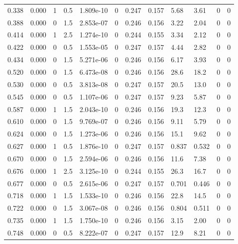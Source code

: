\documentclass[preview]{standalone}
\begin{document}
{{\begin{tabular}{L{1.2cm}C{1.2cm} C{0.3cm}C{0.5cm} C{1.4cm}C{1.4cm} C{1.4cm}C{1.4cm} C{1.6cm}C{1.6cm} C{1.6cm}C{1.6cm}}
  0.338  &  0.000  & 1     & 0.5 &  1.809e-10  & 0  &  0.247&   0.157& 5.68 & 3.61   &  0 & 0  \\ 
  0.388  &  0.000  & 0     & 1.5 &  2.853e-07  & 0  &  0.246&   0.156& 3.22 & 2.04   &  0 & 0  \\ 
  0.414  &  0.000  & 1     & 2.5 &  1.274e-10  & 0  &  0.244&   0.155& 3.34 & 2.12   &  0 & 0  \\ 
  0.422  &  0.000  & 0     & 0.5 &  1.553e-05  & 0  &  0.247&   0.157& 4.44 & 2.82   &  0 & 0  \\ 
  0.434  &  0.000  & 0     & 1.5 &  5.271e-06  & 0  &  0.246&   0.156& 6.17 & 3.93   &  0 & 0  \\ 
  0.520  &  0.000  & 0     & 1.5 &  6.473e-08  & 0  &  0.246&   0.156& 28.6 & 18.2   &  0 & 0  \\ 
  0.530  &  0.000  & 0     & 0.5 &  3.813e-08  & 0  &  0.247&   0.157& 20.5 & 13.0   &  0 & 0  \\ 
  0.545  &  0.000  & 0     & 0.5 &  1.107e-06  & 0  &  0.247&   0.157& 9.23 & 5.87   &  0 & 0  \\ 
  0.587  &  0.000  & 1     & 1.5 &  2.043e-10  & 0  &  0.246&   0.156& 19.3 & 12.3   &  0 & 0  \\ 
  0.610  &  0.000  & 0     & 1.5 &  9.769e-07  & 0  &  0.246&   0.156& 9.11 & 5.79   &  0 & 0  \\ 
  0.624  &  0.000  & 0     & 1.5 &  1.273e-06  & 0  &  0.246&   0.156& 15.1 & 9.62   &  0 & 0  \\ 
  0.627  &  0.000  & 1     & 0.5 &  1.876e-10  & 0  &  0.247&   0.157& 0.837 & 0.532   &  0 & 0  \\ 
  0.670  &  0.000  & 0     & 1.5 &  2.594e-06  & 0  &  0.246&   0.156& 11.6 & 7.38   &  0 & 0  \\ 
  0.676  &  0.000  & 1     & 2.5 &  3.125e-10  & 0  &  0.244&   0.155& 26.3 & 16.7   &  0 & 0  \\ 
  0.677  &  0.000  & 0     & 0.5 &  2.615e-06  & 0  &  0.247&   0.157& 0.701 & 0.446   &  0 & 0  \\ 
  0.718  &  0.000  & 1     & 1.5 &  1.533e-10  & 0  &  0.246&   0.156& 22.8 & 14.5   &  0 & 0  \\ 
  0.722  &  0.000  & 0     & 1.5 &  3.067e-08  & 0  &  0.246&   0.156& 0.804 & 0.511   &  0 & 0  \\ 
  0.735  &  0.000  & 1     & 1.5 &  1.750e-10  & 0  &  0.246&   0.156& 3.15 & 2.00   &  0 & 0  \\ 
  0.748  &  0.000  & 0     & 0.5 &  8.222e-07  & 0  &  0.247&   0.157& 12.9 & 8.21   &  0 & 0  \\ 

\end{tabular}}}
\end{document}
